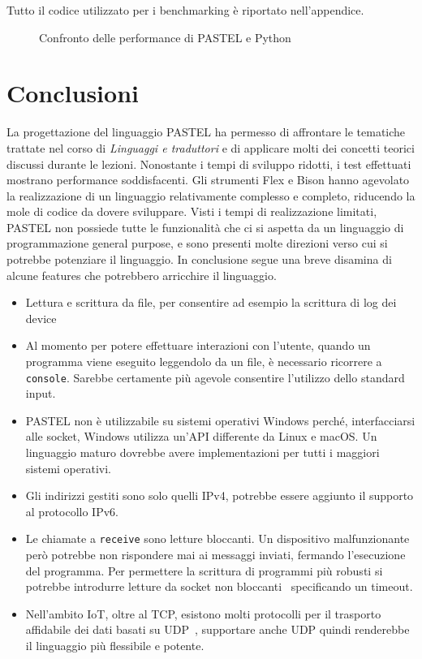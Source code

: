 \documentclass[10pt]{article}
\begin{document}
Tutto il codice utilizzato per i benchmarking è riportato nell'appendice.



\begin{figure}
	\centering
	\caption{Confronto delle performance di PASTEL e Python}
	\label{fig:performance-comparison}
\end{figure}



\section{Conclusioni}\label{section:conclusioni}

La progettazione del linguaggio PASTEL ha permesso di affrontare le tematiche trattate nel corso di \textit{Linguaggi e traduttori} e di applicare molti dei concetti teorici discussi durante le lezioni. Nonostante i tempi di sviluppo ridotti, i test effettuati mostrano performance soddisfacenti.
Gli strumenti Flex e Bison hanno agevolato la realizzazione di un linguaggio relativamente complesso e completo, riducendo la mole di codice da dovere sviluppare.
Visti i tempi di realizzazione limitati, PASTEL non possiede tutte le funzionalità che ci si aspetta da un linguaggio di programmazione general purpose, e sono presenti molte direzioni verso cui si potrebbe potenziare il linguaggio. In conclusione segue una breve disamina di alcune features che potrebbero arricchire il linguaggio. 
\begin{itemize}
	\item Lettura e scrittura da file, per consentire ad esempio la scrittura di log dei device 
	\item Al momento per potere effettuare interazioni con l'utente, quando un programma viene eseguito leggendolo da un file, è necessario ricorrere a \texttt{console}. Sarebbe certamente più agevole consentire l'utilizzo dello standard input.
	\item PASTEL non è utilizzabile su sistemi operativi Windows perché, interfacciarsi alle socket, Windows utilizza un'API differente da Linux e macOS. Un linguaggio maturo dovrebbe avere implementazioni per tutti i maggiori sistemi operativi.
	\item Gli indirizzi gestiti sono solo quelli IPv4, potrebbe essere aggiunto il supporto al protocollo IPv6.
	\item Le chiamate a \texttt{receive} sono letture bloccanti. Un dispositivo malfunzionante però potrebbe non rispondere mai ai messaggi inviati, fermando l'esecuzione del programma. Per permettere la scrittura di programmi più robusti si potrebbe introdurre letture da socket non bloccanti~\cite{hall2001beej} specificando un timeout.
	\item Nell'ambito IoT, oltre al TCP, esistono molti protocolli per il trasporto affidabile dei dati basati su UDP~\cite{masirap2016evaluation}, supportare anche UDP quindi renderebbe il linguaggio più flessibile e potente.
\end{itemize}
\end{document}
